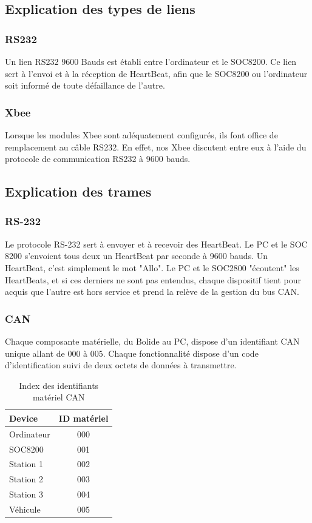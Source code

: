 \documentclass[10pt,a4paper,final]{article}
\begin{document}
\begin{spacing}{1.5}
\subsection{Explication des types de liens}

\subsubsection{RS232}
Un lien RS232 9600 Bauds est établi entre l'ordinateur et le SOC8200. Ce lien sert à l'envoi et à la réception de HeartBeat, afin que le SOC8200 ou l'ordinateur soit informé de toute défaillance de l'autre.

\subsubsection{Xbee}
Lorsque les modules Xbee sont adéquatement configurés, ils font office de remplacement au câble RS232. En effet, nos Xbee discutent entre eux à l'aide du protocole de communication RS232 à 9600 bauds.  

\subsection{Explication des trames}

\subsubsection{RS-232}
Le protocole RS-232 sert à envoyer et à recevoir des HeartBeat. Le PC et le SOC 8200 s'envoient tous deux un HeartBeat par seconde à 9600 bauds. Un HeartBeat, c'est simplement le mot "Allo". Le PC et le SOC2800 "écoutent" les HeartBeats, et si ces derniers ne sont pas entendus, chaque dispositif tient pour acquis que l'autre est hors service et prend la relève de la gestion du bus CAN.\pagebreak

\subsubsection{CAN}
Chaque composante matérielle, du Bolide au PC, dispose d'un identifiant CAN unique allant de 000 à 005. Chaque fonctionnalité dispose d'un code d'identification suivi de deux octets de données à transmettre.

\begin{table}[!ht]
\caption{Index des identifiants matériel CAN}
\medskip
\centering
\begin{tabular}{|l|c|}
\hline 
\textbf{Device} & \textbf{ID matériel} \\ 
\hline 
Ordinateur & 000 \\ 
\hline 
SOC8200 & 001 \\ 
\hline 
Station 1 & 002 \\ 
\hline 
Station 2  & 003 \\ 
\hline
Station 3  & 004 \\
\hline 
Véhicule  & 005 \\ 
\hline 
\end{tabular} 
\label{tab:testtab1}
\end{table} 



\end{spacing}
\end{document}
